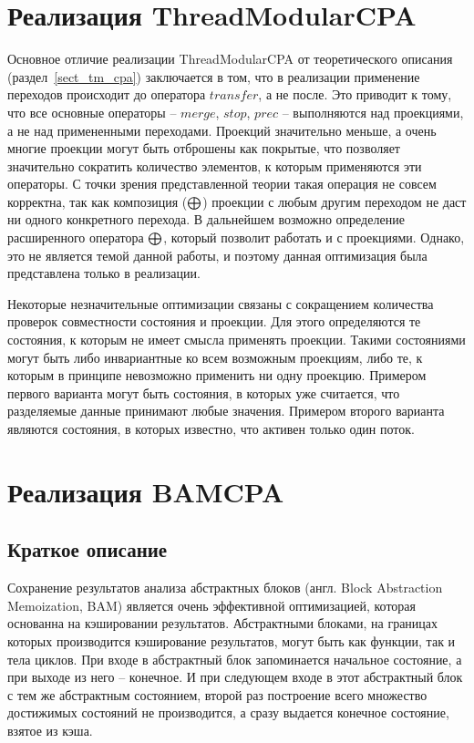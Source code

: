 \section{Реализация ThreadModularCPA}
\label{sect_impl_tm}

Основное отличие реализации ThreadModularCPA от теоретического описания (раздел~\ref{sect_tm_cpa}) заключается в том, что в реализации применение переходов происходит до оператора $transfer$, а не после. 
Это приводит к тому, что все основные операторы -- $merge$, $stop$, $prec$ -- выполняются над проекциями, а не над примененными переходами.
Проекций значительно меньше, а очень многие проекции могут быть отброшены как покрытые, что позволяет значительно сократить количество элементов, к которым применяются эти операторы.
С точки зрения представленной теории такая операция не совсем корректна, так как композиция ($\mathrel{\bigoplus}$) проекции с любым другим переходом не даст ни одного конкретного перехода. 
В дальнейшем возможно определение расширенного оператора $\mathrel{\bigoplus}$, который позволит работать и с проекциями.
Однако, это не является темой данной работы, и поэтому данная оптимизация была представлена только в реализации.

Некоторые незначительные оптимизации связаны с сокращением количества проверок совместности состояния и проекции. 
Для этого определяются те состояния, к которым не имеет смысла применять проекции.
Такими состояниями могут быть либо инвариантные ко всем возможным проекциям, либо те, к которым в принципе невозможно применить ни одну проекцию.
Примером первого варианта могут быть состояния, в которых уже считается, что разделяемые данные принимают любые значения.
Примером второго варианта являются состояния, в которых известно, что активен только один поток.

\section{Реализация BAMCPA}
\label{sect_impl_bam}

\subsection{Краткое описание}
Сохранение результатов анализа абстрактных блоков (англ. Block Abstraction Memoization, BAM) является очень эффективной оптимизацией, которая основанна на кэшировании результатов. 
Абстрактными блоками, на границах которых производится кэширование результатов, могут быть как функции, так и тела циклов. 
При входе в абстрактный блок запоминается начальное состояние, а при выходе из него -- конечное.
И при следующем входе в этот абстрактный блок с тем же абстрактным состоянием, второй раз построение всего множество достижимых состояний не производится, а сразу выдается конечное состояние, взятое из кэша.

